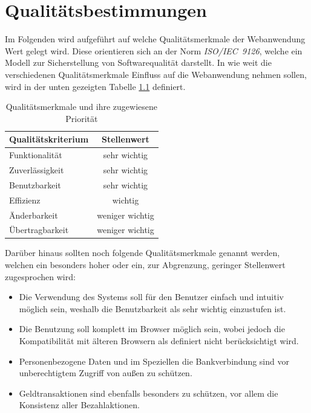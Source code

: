 \documentclass[a4paper]{scrreprt}
\begin{document}
            
         
\chapter{Qualitätsbestimmungen}
	Im Folgenden wird aufgeführt auf welche Qualitätsmerkmale der Webanwendung Wert gelegt wird. Diese orientieren sich an der Norm \textit{ISO/IEC~9126}, welche ein Modell zur Sicherstellung von Softwarequalität darstellt. In wie weit die verschiedenen Qualitätsmerkmale Einfluss auf die Webanwendung nehmen sollen, wird in der unten gezeigten Tabelle \ref{qTabelle} definiert.\\

	\begin{table}[h]
 
	    \begin{center}
		    \begin{tabular}{|l|c|}
			    \hline 
			    \rule[-1ex]{0pt}{2.5ex} \textbf{Qualitätskriterium} & \textbf{Stellenwert} \\ 
			    \hline 
			    \rule[-1ex]{0pt}{2.5ex} Funktionalität & sehr wichtig \\ 
			    \hline 
			    \rule[-1ex]{0pt}{2.5ex} Zuverlässigkeit & sehr wichtig \\ 
			    \hline 
			    \rule[-1ex]{0pt}{2.5ex} Benutzbarkeit & sehr wichtig \\ 
			    \hline 
			    \rule[-1ex]{0pt}{2.5ex} Effizienz & wichtig \\ 
			    \hline 
			    \rule[-1ex]{0pt}{2.5ex} Änderbarkeit & weniger wichtig \\ 
			    \hline 
			    \rule[-1ex]{0pt}{2.5ex} Übertragbarkeit & weniger wichtig \\ 
			    \hline   
		    \end{tabular}  
	    \end{center}
	    \caption{Qualitätsmerkmale und ihre zugewiesene Priorität} 
	    \label{qTabelle}   
	\end{table}
    
	Darüber hinaus sollten noch folgende Qualitätsmerkmale genannt werden, welchen ein besonders hoher oder ein, zur Abgrenzung, geringer Stellenwert zugesprochen wird:
		\begin{itemize}
		 	\item Die Verwendung des Systems soll für den Benutzer einfach und intuitiv möglich sein, weshalb die Benutzbarkeit als sehr wichtig einzustufen ist.
		 	\item Die Benutzung soll komplett im Browser möglich sein, wobei jedoch die Kompatibilität mit älteren Browsern als definiert nicht berücksichtigt wird.
		 	\item Personenbezogene Daten und im Speziellen die Bankverbindung sind vor unberechtigtem Zugriff von außen zu schützen.
		 	\item Geldtransaktionen sind ebenfalls besonders zu schützen, vor allem die \gls{Konsistenz} aller Bezahlaktionen.
 \end{itemize}
 
\end{document}
